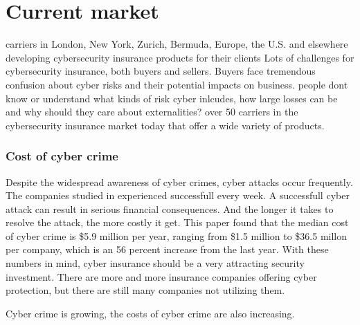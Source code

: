 \chapter{Current market}
\label{chp:hvahardenneaasi??} 
carriers in London, New York, Zurich, Bermuda, Europe, the U.S. and 
elsewhere developing cybersecurity insurance products for their clients
Lots of challenges for cybersecurity insurance, both buyers and sellers. 
Buyers face tremendous confusion about cyber risks and their potential impacts on business. 
people dont know or understand what kinds of risk cyber inlcudes, 
how large losses can be and why should they care about externalities?
over 50 carriers in the cybersecurity insurance market today that offer a wide variety of products.
\cite{Cyberworkshop}
\subsection{Cost of cyber crime}
Despite the widespread awareness of cyber crimes, cyber attacks occur frequently. The companies studied in \cite{ccost} experienced successfull every week. A successfull cyber attack can result in serious financial consequences. And the longer it takes to resolve the attack, the more costly it get. This paper found that the median cost of cyber crime is \$5.9 million per year, ranging from \$1.5 million to \$36.5 millon per company, which is an 56 percent increase from the last year. With these numbers in mind, cyber insurance should be a very attracting security investment. There are more and more insurance companies offering cyber protection, but there are still many companies not utilizing them. \cite{compworld}

Cyber crime is growing, the costs of cyber crime are also increasing.